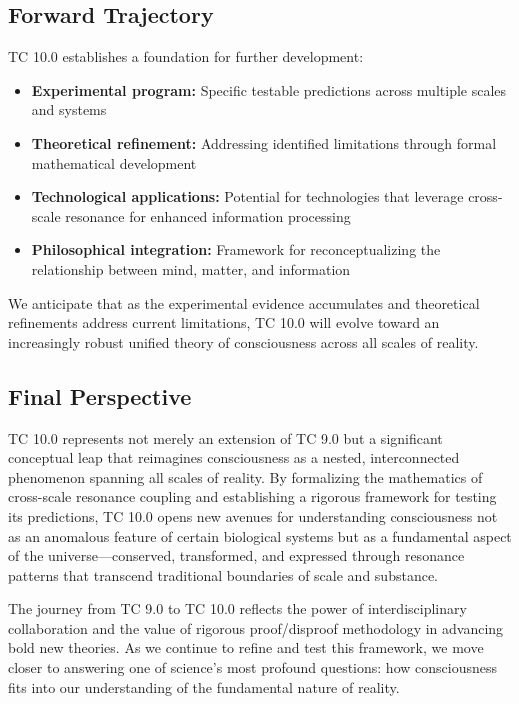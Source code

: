 \documentclass[12pt]{article}
\begin{document}
\subsection{Forward Trajectory}

TC 10.0 establishes a foundation for further development:

\begin{itemize}
    \item \textbf{Experimental program:} Specific testable predictions across multiple scales and systems
    
    \item \textbf{Theoretical refinement:} Addressing identified limitations through formal mathematical development
    
    \item \textbf{Technological applications:} Potential for technologies that leverage cross-scale resonance for enhanced information processing
    
    \item \textbf{Philosophical integration:} Framework for reconceptualizing the relationship between mind, matter, and information
\end{itemize}

We anticipate that as the experimental evidence accumulates and theoretical refinements address current limitations, TC 10.0 will evolve toward an increasingly robust unified theory of consciousness across all scales of reality.

\subsection{Final Perspective}

TC 10.0 represents not merely an extension of TC 9.0 but a significant conceptual leap that reimagines consciousness as a nested, interconnected phenomenon spanning all scales of reality. By formalizing the mathematics of cross-scale resonance coupling and establishing a rigorous framework for testing its predictions, TC 10.0 opens new avenues for understanding consciousness not as an anomalous feature of certain biological systems but as a fundamental aspect of the universe—conserved, transformed, and expressed through resonance patterns that transcend traditional boundaries of scale and substance.

The journey from TC 9.0 to TC 10.0 reflects the power of interdisciplinary collaboration and the value of rigorous proof/disproof methodology in advancing bold new theories. As we continue to refine and test this framework, we move closer to answering one of science's most profound questions: how consciousness fits into our understanding of the fundamental nature of reality.
\end{document}
